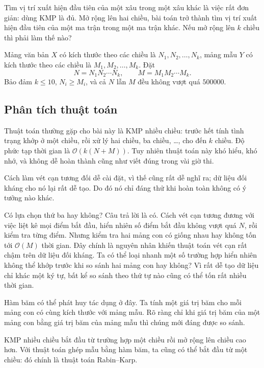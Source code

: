 \documentclass[11pt]{article}
\newcommand{\Oh}{\mathcal{O}}
\begin{document}
Tìm vị trí xuất hiện đầu tiên của một xâu trong một xâu khác là việc rất đơn
giản: dùng KMP là đủ. Mở rộng lên hai chiều, bài toán trở thành tìm vị trí
xuất hiện đầu tiên của một ma trận trong một ma trận khác. Nếu mở rộng lên
$k$ chiều thì phải làm thế nào?

Mảng văn bản $X$ có kích thước theo các chiều là
$N_1,N_2,\ldots,N_k$, mảng mẫu $Y$ có kích thước theo các chiều là
$M_1,M_2,\ldots,M_k$. Đặt
\[
  N=N_1N_2\cdots N_k,\qquad M=M_1M_2\cdots M_k.
\]
Bảo đảm $k\le 10$, $N_i\ge M_i$, và cả $N$ lẫn $M$ đều không vượt quá
$500000$.

\subsection{Phân tích thuật toán}

Thuật toán thường gặp cho bài này là KMP nhiều chiều: trước hết tính tình
trạng khớp ở một chiều, rồi xử lý hai chiều, ba chiều, \ldots, cho đến $k$
chiều. Độ phức tạp thời gian là $\Oh(k(N+M))$. Tuy nhiên thuật toán này khó
hiểu, khó nhớ, và không dễ hoàn thành cũng như viết đúng trong vài giờ thi.

Cách làm vét cạn tương đối dễ cài đặt, vì thế cũng rất dễ nghĩ ra; dữ liệu
đối kháng cho nó lại rất dễ tạo. Do đó nó chỉ đáng thử khi hoàn toàn không
có ý tưởng nào khác.

Có lựa chọn thứ ba hay không? Câu trả lời là có. Cách vét cạn tương đương với
việc liệt kê mọi điểm bắt đầu, hiển nhiên số điểm bắt đầu không vượt quá $N$,
rồi kiểm tra từng điểm. Nhưng kiểm tra hai mảng con có giống nhau hay không
tốn tới $\Oh(M)$ thời gian. Đây chính là nguyên nhân khiến thuật toán vét cạn
rất chậm trên dữ liệu đối kháng. Ta có thể loại nhanh một số trường hợp hiển
nhiên không thể khớp trước khi so sánh hai mảng con hay không? Vì rất dễ tạo
dữ liệu chỉ khác một ký tự, bất kể so sánh theo thứ tự nào cũng có thể tốn
rất nhiều thời gian.

Hàm băm có thể phát huy tác dụng ở đây. Ta tính một giá trị băm cho mỗi mảng
con có cùng kích thước với mảng mẫu. Rõ ràng chỉ khi giá trị băm của một mảng
con bằng giá trị băm của mảng mẫu thì chúng mới đáng được so sánh.

KMP nhiều chiều bắt đầu từ trường hợp một chiều rồi mở rộng lên chiều cao
hơn. Với thuật toán ghép mẫu bằng hàm băm, ta cũng có thể bắt đầu từ một
chiều: đó chính là thuật toán Rabin--Karp.
\end{document}
